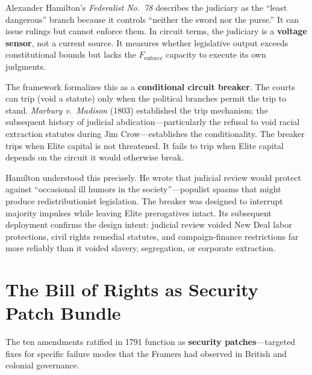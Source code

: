 Alexander Hamilton's \textit{Federalist No.~78} describes the judiciary as the ``least dangerous'' branch because it controls ``neither the sword nor the purse.'' It can issue rulings but cannot enforce them. In circuit terms, the judiciary is a \textbf{voltage sensor}, not a current source. It measures whether legislative output exceeds constitutional bounds but lacks the $F_{\text{enforce}}$ capacity to execute its own judgments.

The framework formalizes this as a \textbf{conditional circuit breaker}. The courts can trip (void a statute) only when the political branches permit the trip to stand. \textit{Marbury v.~Madison} (1803) established the trip mechanism; the subsequent history of judicial abdication---particularly the refusal to void racial extraction statutes during Jim Crow---establishes the conditionality. The breaker trips when Elite capital is not threatened. It fails to trip when Elite capital depends on the circuit it would otherwise break.

Hamilton understood this precisely. He wrote that judicial review would protect against ``occasional ill humors in the society''---populist spasms that might produce redistributionist legislation. The breaker was designed to interrupt majority impulses while leaving Elite prerogatives intact. Its subsequent deployment confirms the design intent: judicial review voided New Deal labor protections, civil rights remedial statutes, and campaign-finance restrictions far more reliably than it voided slavery, segregation, or corporate extraction.

\section{The Bill of Rights as Security Patch Bundle}

The ten amendments ratified in 1791 function as \textbf{security patches}---targeted fixes for specific failure modes that the Framers had observed in British and colonial governance.


